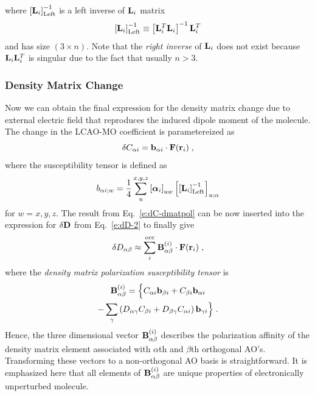 \documentclass[aip,amsmath,amssymb,reprint,floatfix]{revtex4-1}
\newcommand{\BM}[1]{\bm{#1}}
\begin{document}
%
where $\left[ {\bf L}_i  \right]^{-1}_{\rm Left}$ is a left inverse
of ${\bf L}_i$ matrix 
%
\begin{equation} 
      \left[ {\bf L}_i  \right]^{-1}_{\rm Left}   \equiv
       \left[ {\bf L}_i^T {\bf L}_i \right]^{-1} {\bf L}_i^T 
\end{equation}
%
and has size $(3\times n)$. Note that the \emph{right inverse} of ${\bf L}_i$
does not exist because ${\bf L}_i {\bf L}_i^T$ is singular due to the fact that usually
$n > 3$.

\subsubsection{Density Matrix Change}

Now we can obtain the final expression for the density matrix change 
due to external electric field that reproduces the 
induced dipole moment of the molecule.
The change in the LCAO\hyp{}MO coefficient is parametereized as
%
\begin{equation} \label{e:dC-dmatpol}
 \delta C_{\alpha i} = {\bf b}_{\alpha i} \cdot {\bf F}({\bf r}_i)  \;,
\end{equation}
%
where the susceptibility tensor is defined as
%
\begin{equation} \label{e:susceptibility-b}
  b_{\alpha i;w} = \frac{1}{4} \sum_u^{x, y, z} \left[ {\BM{\alpha}}_i \right]_{uw}
   \left[ \left[ {\bf L}_i  \right]^{-1}_{\rm Left} \right]_{u;\alpha}  
\end{equation}
%
for $w=x,y,z$. The result from Eq.~\eqref{e:dC-dmatpol} can be now inserted into 
the expression for $\delta {\bf D}$ from Eq.~\eqref{e:dD-2} to finally give
%
\begin{equation}\label{e:final-model.HF}
 \delta D_{\alpha\beta} \approx \sum_i^{\rm occ} {\bf B}^{(i)}_{\alpha\beta} \cdot {\bf F}({\bf r}_i)  \;,
\end{equation}
%
where the \emph{density matrix polarization susceptibility tensor} is
%
\begin{multline}  \label{e:susceptibility-B}
 {\bf B}^{(i)}_{\alpha\beta} = \Big\{
                               C_{\alpha i} {\bf b}_{\beta i} + C_{\beta i} {\bf b}_{\alpha i} \\
                                - \sum_\gamma 
                                 \left( 
               D_{\alpha\gamma} C_{\beta i} + D_{\beta\gamma} C_{\alpha i}
                                 \right)
                                           {\bf b}_{\gamma i}
%
\Big\}  \;.
\end{multline}
%
Hence, the three dimensional vector ${\bf B}^{(i)}_{\alpha\beta}$ describes the polarization affinity
of the density matrix element associated with $\alpha$th and $\beta$th orthogonal AO's.
Transforming these vectors to a non\hyp{}orthogonal AO basis is straightforward.
It is emphasized here that all elements of ${\bf B}_{\alpha\beta}^{(i)}$
are unique properties of electronically unperturbed molecule. 
\end{document}
